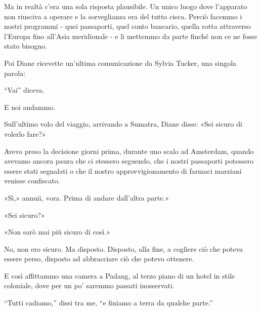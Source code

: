 Ma in realtà c'era una sola risposta plausibile. Un unico luogo dove
l'apparato non riusciva a operare e la sorveglianza era del tutto cieca.
Perciò facemmo i nostri programmi - quei passaporti, quel conto
bancario, quella rotta attraverso l'Europa fino all'Asia meridionale - e
li mettemmo da parte finché non ce ne fosse stato bisogno.

Poi Diane ricevette un'ultima comunicazione da Sylvia Tucker, una
singola parola:

``Vai'' diceva.

E noi andammo.

\separatorefiori

Sull'ultimo volo del viaggio, arrivando a Sumatra, Diane disse: «Sei
sicuro di volerlo fare?»

Avevo preso la decisione giorni prima, durante uno scalo ad Amsterdam,
quando avevamo ancora paura che ci stessero seguendo, che i nostri
passaporti potessero essere stati segnalati o che il nostro
approvvigionamento di farmaci marziani venisse confiscato.

«Sì,» annuii, «ora. Prima di andare dall'altra parte.»

«Sei sicuro?»

«Non sarò mai più sicuro di così.»

No, non ero sicuro. Ma disposto. Disposto, alla fine, a cogliere ciò che
poteva essere perso, disposto ad abbracciare ciò che potevo ottenere.

E così affittammo una camera a Padang, al terzo piano di un hotel in
stile coloniale, dove per un po' saremmo passati inosservati.

``Tutti cadiamo,'' dissi tra me, ``e finiamo a terra da qualche parte.''
